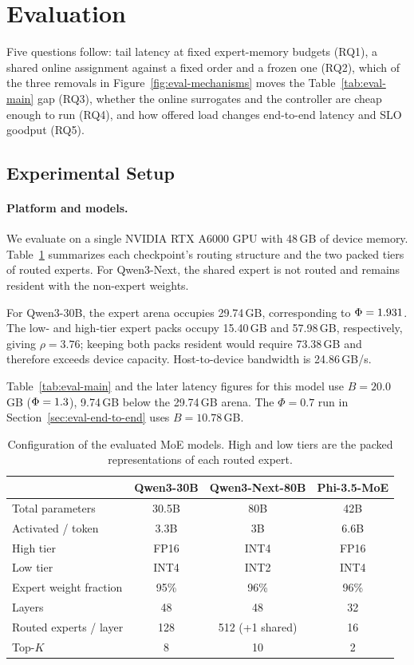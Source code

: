 \section{Evaluation}
\label{sec:eval}

Five questions follow: tail latency at fixed expert-memory budgets (RQ1), a shared online assignment against a fixed order and a frozen one (RQ2), which of the three removals in Figure~\ref{fig:eval-mechanisms} moves the Table~\ref{tab:eval-main} gap (RQ3), whether the online surrogates and the controller are cheap enough to run (RQ4), and how offered load changes end-to-end latency and SLO goodput (RQ5).

\subsection{Experimental Setup}
\label{sec:eval-setup}

\paragraph{Platform and models.}
We evaluate on a single NVIDIA RTX A6000 GPU with 48\,GB of device memory. Table~\ref{tab:eval-models} summarizes each checkpoint's routing structure and the two packed tiers of routed experts. For Qwen3-Next, the shared expert is not routed and remains resident with the non-expert weights.

For Qwen3-30B, the expert arena occupies 29.74\,GB, corresponding to \(\Phi=1.931\). The low- and high-tier expert packs occupy 15.40\,GB and 57.98\,GB, respectively, giving \(\rho=3.76\); keeping both packs resident would require 73.38\,GB and therefore exceeds device capacity. Host-to-device bandwidth is 24.86\,GB/s.

Table~\ref{tab:eval-main} and the later latency figures for this model use \(B=20.0\)\,GB (\(\Phi=1.3\)), 9.74\,GB below the 29.74\,GB arena. The \(\Phi=0.7\) run in Section~\ref{sec:eval-end-to-end} uses \(B=10.78\)\,GB.

\begin{table}[tbh]
  \centering
  \caption{Configuration of the evaluated MoE models.
  High and low tiers are the packed representations of each routed expert.}
  \label{tab:eval-models}
  \small
  \setlength{\tabcolsep}{3.5pt}
  \begin{tabular}{@{}lccc@{}}
    \toprule
    & Qwen3-30B & Qwen3-Next-80B & Phi-3.5-MoE \\
    \midrule
    Total parameters & 30.5B & 80B & 42B \\
    Activated / token & 3.3B & 3B & 6.6B \\
    High tier & FP16 & INT4 & FP16 \\
    Low tier & INT4 & INT2 & INT4 \\
    Expert weight fraction & 95\% & 96\% & 96\% \\
    Layers & 48 & 48 & 32 \\
    Routed experts / layer & 128 & 512 (+1 shared) & 16 \\
    Top-$K$ & 8 & 10 & 2 \\
    \bottomrule
  \end{tabular}
\end{table}

